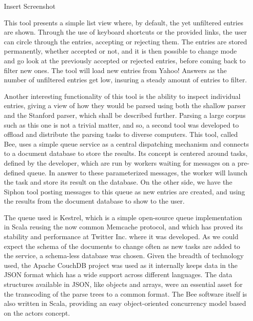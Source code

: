 \begin{huge}
  Insert Screenshot
\end{huge}

This tool presents a simple list view where, by default, the yet unfiltered entries are shown. Through the use of keyboard shortcuts or the provided links, the user can circle through the entries, accepting or rejecting them. The entries are stored permanently, whether accepted or not, and it is then possible to change mode and go look at the previously accepted or rejected entries, before coming back to filter new ones. The tool will load new entries from Yahoo! Answers as the number of unfiltered entries get low, insuring a steady amount of entries to filter.

Another interesting functionality of this tool is the ability to inspect individual entries, giving a view of how they would be parsed using both the shallow parser and the Stanford parser, which shall be described further. Parsing a large corpus such as this one is not a trivial matter, and so, a second tool was developed to offload and distribute the parsing tasks to diverse computers. This tool, called Bee, uses a simple queue service as a central dispatching mechanism and connects to a document database to store the results. Its concept is centered around tasks, defined by the developer, which are run by workers waiting for messages on a pre-defined queue. In answer to these parameterized messages, the worker will launch the task and store its result on the database. On the other side, we have the Siphon tool posting messages to this queue as new entries are created, and using the results from the document database to show to the user.

The queue used is Kestrel, which is a simple open-source queue implementation in Scala reusing the now common Memcache protocol, and which has proved its stability and performance at Twitter Inc. where it was developed. As we could expect the schema of the documents to change often as new tasks are added to the service, a schema-less database was chosen. Given the breadth of technology used, the Apache CouchDB project was used as it internally keeps data in the JSON format which has a wide support across different languages. The data structures available in JSON, like objects and arrays, were an essential asset for the transcoding of the parse trees to a common format. The Bee software itself is also written in Scala, providing an easy object-oriented concurrency model based on the actors concept.

